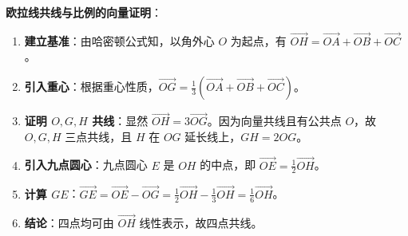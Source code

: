 \begin{proofbox}
\textbf{欧拉线共线与比例的向量证明}：
\begin{enumerate}
    \item \textbf{建立基准}：由哈密顿公式知，以角外心 $O$ 为起点，有 $\vec{OH} = \vec{OA} + \vec{OB} + \vec{OC}$。
    \item \textbf{引入重心}：根据重心性质，$\vec{OG} = \frac{1}{3}(\vec{OA} + \vec{OB} + \vec{OC})$。
    \item \textbf{证明 $O, G, H$ 共线}：显然 $\vec{OH} = 3\vec{OG}$。因为向量共线且有公共点 $O$，故 $O, G, H$ 三点共线，且 $H$ 在 $OG$ 延长线上，$GH = 2OG$。
    \item \textbf{引入九点圆心}：九点圆心 $E$ 是 $OH$ 的中点，即 $\vec{OE} = \frac{1}{2}\vec{OH}$。
    \item \textbf{计算 $GE$}：$\vec{GE} = \vec{OE} - \vec{OG} = \frac{1}{2}\vec{OH} - \frac{1}{3}\vec{OH} = \frac{1}{6}\vec{OH}$。
    \item \textbf{结论}：四点均可由 $\vec{OH}$ 线性表示，故四点共线。
\end{enumerate}
\end{proofbox}